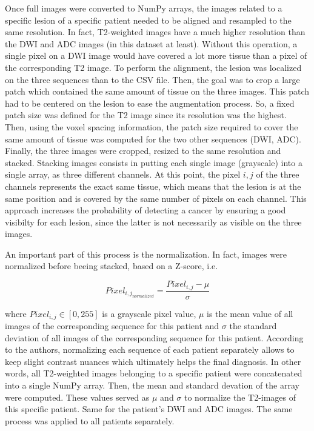 Once full images were converted to NumPy arrays, the images related to a specific lesion of a specific patient needed to be aligned and resampled to the same resolution. In fact, T2-weighted images have a much higher resolution than the DWI and ADC images (in this dataset at least). Without this operation, a single pixel on a DWI image would have covered a lot more tissue than a pixel of the corresponding T2 image. To perform the alignment, the lesion was localized on the three sequences than to the CSV file. Then, the goal was to crop a large patch which contained the same amount of tissue on the three images. This patch had to be centered on the lesion to ease the augmentation process. So, a fixed patch size was defined for the T2 image since its resolution was the highest. Then, using the voxel spacing information, the patch size required to cover the same amount of tissue was computed for the two other sequences (DWI, ADC). Finally, the three images were cropped, resized to the same resolution and stacked. Stacking images consists in putting each single image (grayscale) into a single array, as three different channels. At this point, the pixel $i,j$ of the three channels represents the exact same tissue, which means that the lesion is at the same position and is covered by the same number of pixels on each channel. This approach increases the probability of detecting a cancer by ensuring a good visibilty for each lesion, since the latter is not necessarily as visible on the three images.

An important part of this process is the normalization. In fact, images were normalized before beeing stacked, based on a Z-score, i.e. 

\begin{equation}
\label{eq:normalization}
	Pixel_{{i,j}_{normalized}} = \frac{Pixel_{i,j} - \mu}{\sigma}
\end{equation}

\noindent where $Pixel_{i,j} \in [0,255]$ is a grayscale pixel value, $\mu$ is the mean value of all images of the corresponding sequence for this patient and $\sigma$ the standard deviation of all images of the corresponding sequence for this patient. According to the authors, normalizing each sequence of each patient separately allows to keep slight contrast nuances which ultimately helps the final diagnosis. In other words, all T2-weighted images belonging to a specific patient were concatenated into a single NumPy array. Then, the mean and standard devation of the array were computed. These values served as $\mu$ and $\sigma$ to normalize the T2-images of this specific patient. Same for the patient's DWI and ADC images. The same process was applied to all patients separately. 

